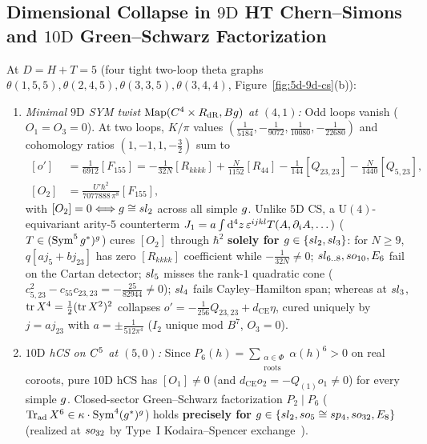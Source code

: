 \subsection{Dimensional Collapse in \texorpdfstring{$9\mathrm{D}$}{9D} HT Chern--Simons and \texorpdfstring{$10\mathrm{D}$}{10D} Green--Schwarz Factorization}
\label{subsec:9d-10d-cs}

\begin{theorem}
\label{thm:9d-10d-cs}
At $D = H+T = 5$ (four tight two-loop theta graphs $\theta(1,5,5),\theta(2,4,5),\theta(3,3,5),\theta(3,4,4)$, Figure~\ref{fig:5d-9d-cs}(b)):
\begin{enumerate}[label=(\arabic*),leftmargin=*]
  \item \emph{Minimal $9\mathrm{D}$ SYM twist $\mathrm{Map}(C^4\times R_{\mathrm{dR}}, Bg)$ at $(4,1)$:} Odd loops vanish ($O_1 = O_3 = 0$). At two loops, $K/\pi$ values $(\frac{1}{5184}, -\frac{1}{9072}, \frac{1}{10080}, -\frac{1}{22680})$ and cohomology ratios $(1,-1,1,-\frac{3}{2})$ sum to
  \begin{equation}
  \label{eq:9d-cs-o2}
  \begin{aligned}
  [o'] &= \frac{1}{6912}[F_{155}] = -\frac{1}{32N}[R_{kkkk}] + \frac{N}{1152}[R_{44}] - \frac{1}{144}[Q_{23,23}] - \frac{N}{1440}[Q_{5,23}],\\
  [O_2] &= \frac{U'\hbar^2}{7077888\,\pi^8}[F_{155}],
  \end{aligned}
  \end{equation}
  with $[O_2] = 0 \Longleftrightarrow g \cong sl_2$ across all simple $g$. Unlike $5\mathrm{D}$ CS, a $\mathrm{U}(4)$-equivariant arity-$5$ counterterm $J_1 = a\int\mathrm{d}^4z\,\varepsilon^{ijkl}T(A,\partial_i A,\dots)$ ($T \in (\operatorname{Sym}^5g^*)^{g}$) cures $[O_2]$ through $\hbar^2$ \textbf{solely for $g \in \{sl_2, sl_3\}$}: for $N \ge 9$, $q[a j_5 + b j_{23}]$ has zero $[R_{kkkk}]$ coefficient while $-\frac{1}{32N} \neq 0$; $sl_{6..8}, so_{10}, E_6$ fail on the Cartan detector; $sl_5$ misses the rank-$1$ quadratic cone ($c_{5,23}^2 - c_{55}c_{23,23} = -\frac{25}{82944} \neq 0$); $sl_4$ fails Cayley--Hamilton span; whereas at $sl_3$, $\operatorname{tr} X^4 = \frac{1}{2}(\operatorname{tr} X^2)^2$ collapses $o' = -\frac{1}{256}Q_{23,23} + d_{\mathrm{CE}}\eta$, cured uniquely by $j = a j_{23}$ with $a = \pm\frac{1}{512\pi^4}$ ($I_2$ unique mod $B^7$, $O_3 = 0$).

  \item \emph{$10\mathrm{D}$ hCS on $C^5$ at $(5,0)$:} Since $P_6(h) = \sum_{\substack{\alpha\in\Phi\\\mathrm{roots}}}\alpha(h)^6 > 0$ on real coroots, pure $10\mathrm{D}$ hCS has $[O_1] \neq 0$ (and $d_{\mathrm{CE}}o_2 = -Q_{(1)}o_1 \neq 0$) for every simple $g$. Closed-sector Green--Schwarz factorization $P_2 \mid P_6$ ($\operatorname{Tr}_{\mathrm{ad}}X^6 \in \kappa\cdot\operatorname{Sym}^4(g^*)^{g}$) holds \textbf{precisely for $g \in \{sl_2, so_5\cong sp_4, so_{32}, E_8\}$} (realized at $so_{32}$ by Type~I Kodaira--Spencer exchange~\cite{CL19}).
\end{enumerate}
\end{theorem}

